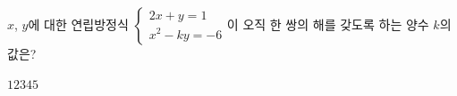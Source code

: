$x$, $y$에 대한 연립방정식 $\begin{cases} 2x+y=1 \\ x^2-ky=-6 \end{cases}$이 오직 한 쌍의 해를 갖도록 하는 양수 $k$의 값은?
\begin{choices32}{$1$}{$2$}{$3$}{$4$}{$5$}\end{choices32}
